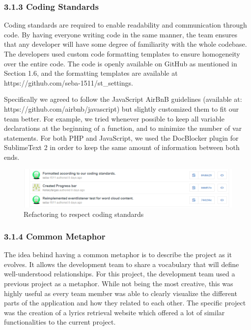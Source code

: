 \documentclass[]{article}
\begin{document}
\subsubsection{3.1.3 Coding Standards}\label{coding-standards}

Coding standards are required to enable readability and communication
through code. By having everyone writing code in the same manner, the
team ensures that any developer will have some degree of familiarity
with the whole codebase. The developers used custom code formatting
templates to ensure homogeneity over the entire code. The code is openly
available on GitHub as mentioned in Section 1.6, and the formatting
templates are available at https://github.com/seba-1511/st\_settings.

Specifically we agreed to follow the JavaScript AirBnB guidelines
(available at: https://github.com/airbnb/javascript) but slightly
customized them to fit our team better. For example, we tried whenever
possible to keep all variable declarations at the beginning of a
function, and to minimize the number of var statements. For both PHP and
JavaScript, we used the DocBlocker plugin for SublimeText 2 in order to
keep the same amount of information between both ends.

\begin{figure}[htbp]
\centering
\includegraphics{images/kelsey_pair.png}
\caption{Refactoring to respect coding standards}
\end{figure}


\subsubsection{3.1.4 Common Metaphor}\label{common-metaphor}

The idea behind having a common metaphor is to describe the project as
it evolves. It allows the development team to share a vocabulary that
will define well-understood relationships. For this project, the
development team used a previous project as a metaphor. While not being
the most creative, this was highly useful as every team member was able
to clearly visualize the different parts of the application and how they
related to each other. The specific project was the creation of a lyrics
retrieval website which offered a lot of similar functionalities to the
current project.
\end{document}
